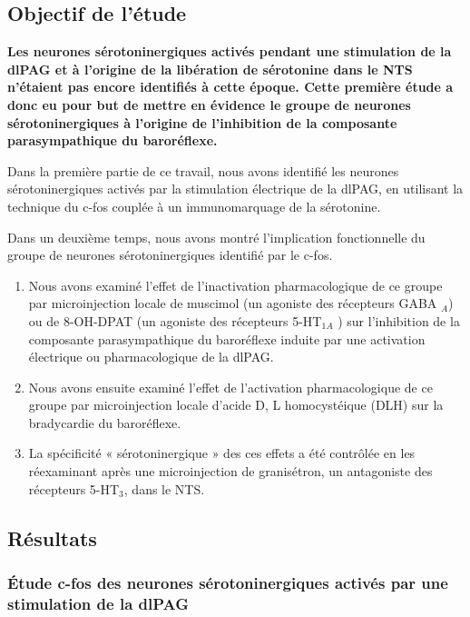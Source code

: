 \documentclass[a4paper,12pt,twoside]{report}
\begin{document}
\subsection{Objectif de l’étude}

\textbf{Les neurones sérotoninergiques activés pendant une stimulation de la dlPAG et à l’origine de la libération de sérotonine dans le NTS n’étaient pas encore identifiés à cette époque. Cette première étude a donc eu pour but de mettre en évidence le groupe de neurones sérotoninergiques à l’origine de l’inhibition de la composante parasympathique du baroréflexe.}

Dans la première partie de ce travail, nous avons identifié les neurones sérotoninergiques activés par la stimulation électrique de la dlPAG, en utilisant la technique du c-fos couplée à un immunomarquage de la sérotonine. 

Dans un deuxième temps, nous avons montré l’implication fonctionnelle du groupe de neurones sérotoninergiques identifié par le c-fos. 

\begin{enumerate}
\item Nous avons examiné l’effet de l’inactivation pharmacologique de ce groupe par microinjection locale de muscimol (un agoniste des récepteurs GABA $_{A}$) ou de 8-OH-DPAT (un agoniste des récepteurs 5-HT$_{1A}$ ) sur l’inhibition de la composante parasympathique du baroréflexe induite par une activation électrique ou pharmacologique de la dlPAG. 
\item Nous avons ensuite examiné l’effet de l’activation pharmacologique de ce groupe par microinjection locale d’acide D, L homocystéique (DLH) sur la bradycardie du baroréflexe. 
\item La spécificité « sérotoninergique » des ces effets a été contrôlée en les réexaminant après une microinjection de granisétron, un antagoniste des récepteurs 5-HT$_{3}$, dans le NTS.\end{enumerate}

\subsection{Résultats}

\subsubsection{Étude c-fos des neurones sérotoninergiques activés par une stimulation de la dlPAG}
\end{document}
